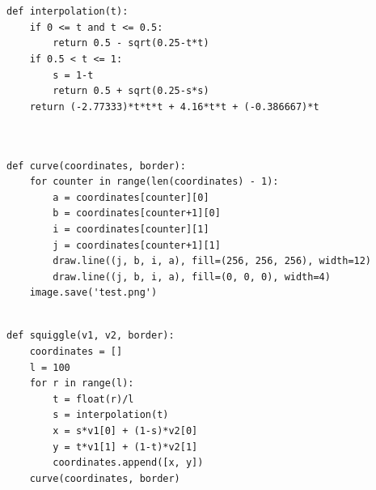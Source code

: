 \documentclass{book}
\newcounter{pcounter}
\begin{document}
\begin{center}
\begin{tcolorbox}[width=5in,colback={white},title={\begin{center}\texttt{Python \thepcounter} \addtocounter{pcounter}{1}  \end{center}},colbacktitle=Red,coltitle=black]
\begin{verbatim}


def interpolation(t):
    if 0 <= t and t <= 0.5:
        return 0.5 - sqrt(0.25-t*t)
    if 0.5 < t <= 1:
        s = 1-t
        return 0.5 + sqrt(0.25-s*s)
    return (-2.77333)*t*t*t + 4.16*t*t + (-0.386667)*t

\end{verbatim}%
\end{tcolorbox}
\end{center}

\begin{center}
\begin{tcolorbox}[width=5in,colback={white},title={\begin{center}\texttt{Python \thepcounter} \addtocounter{pcounter}{1}  \end{center}},colbacktitle=Red,coltitle=black]
\begin{verbatim}


def curve(coordinates, border):
    for counter in range(len(coordinates) - 1):
        a = coordinates[counter][0]
        b = coordinates[counter+1][0]
        i = coordinates[counter][1]
        j = coordinates[counter+1][1]
        draw.line((j, b, i, a), fill=(256, 256, 256), width=12) 
        draw.line((j, b, i, a), fill=(0, 0, 0), width=4)
    image.save('test.png')      

\end{verbatim}%
\end{tcolorbox}
\end{center}

\begin{center}
\begin{tcolorbox}[width=5in,colback={white},title={\begin{center}\texttt{Python \thepcounter} \addtocounter{pcounter}{1}  \end{center}},colbacktitle=Red,coltitle=black]
\begin{verbatim}

def squiggle(v1, v2, border):
    coordinates = []
    l = 100
    for r in range(l):
        t = float(r)/l
        s = interpolation(t)
        x = s*v1[0] + (1-s)*v2[0]
        y = t*v1[1] + (1-t)*v2[1]
        coordinates.append([x, y])
    curve(coordinates, border)

\end{verbatim}%
\end{tcolorbox}
\end{center}
\end{document}
